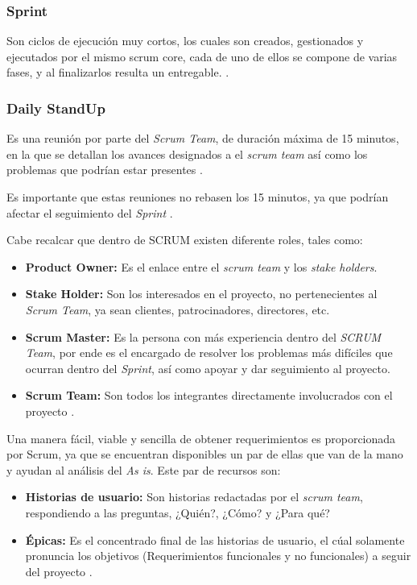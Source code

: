 \documentclass[10pt]{article}
\begin{document}
\subsubsection{Sprint}
Son ciclos de ejecución muy cortos, los cuales son creados, gestionados y ejecutados por el mismo scrum core, cada de uno de ellos se compone de varias fases, y al finalizarlos resulta un entregable. \cite{IEEEreferencias:Ref21}.

\subsubsection{Daily StandUp}
Es una reunión por parte del \textit{Scrum Team}, de duración máxima de 15 minutos, en la que se detallan los avances designados a el \textit{scrum team} así como los problemas que podrían estar presentes \cite{IEEEreferencias:Ref21}.

\setlength{\parskip}{2mm}

Es importante que estas reuniones no rebasen los 15 minutos, ya que podrían afectar el seguimiento del \textit{Sprint} \cite{IEEEreferencias:Ref24}.

\setlength{\parskip}{2mm}

Cabe recalcar que dentro de SCRUM existen diferente roles, tales como:
\begin{itemize}
    \item \textbf{Product Owner:} Es el enlace entre el \textit{scrum team} y los \textit{stake holders}.
    \item \textbf{Stake Holder:} Son los interesados en el proyecto, no pertenecientes al \textit{Scrum Team}, ya sean clientes, patrocinadores, directores, etc.
    \item \textbf{Scrum Master:} Es la persona con más experiencia dentro del \textit{SCRUM Team}, por ende es el encargado de resolver los problemas más difíciles que ocurran dentro del \textit{Sprint}, así como apoyar y dar seguimiento al proyecto.
    \item \textbf{Scrum Team:} Son todos los integrantes directamente involucrados con el proyecto \cite{IEEEreferencias:Ref24}.
\end{itemize}

Una manera fácil, viable y sencilla de obtener requerimientos es proporcionada por Scrum, ya que se encuentran disponibles un par de ellas que van de la mano y ayudan al análisis del \textit{As is}. Este par de recursos son: 

\begin{itemize}
    \item \textbf{Historias de usuario:} Son historias redactadas por el \textit{scrum team}, respondiendo a las preguntas, ¿Quién?, ¿Cómo? y ¿Para qué?
    \item \textbf{Épicas:} Es el concentrado final de las historias de usuario, el cúal solamente pronuncia los objetivos (Requerimientos funcionales y no funcionales) a seguir del proyecto \cite{IEEEreferencias:Ref24}.
\end{itemize}
\end{document}
